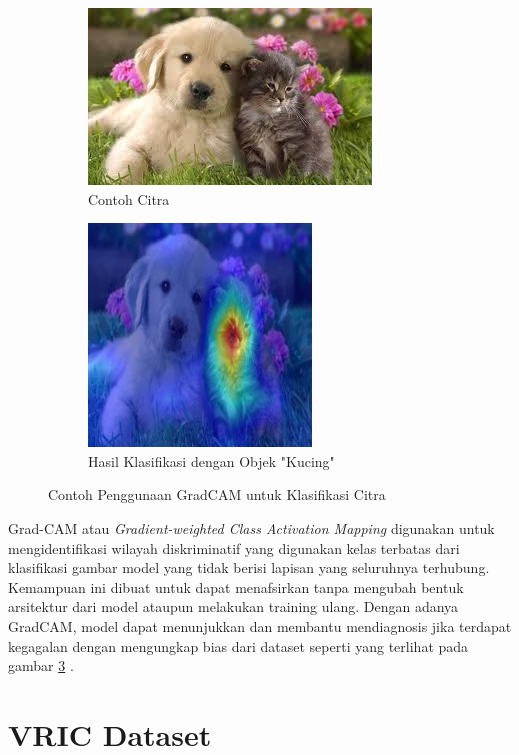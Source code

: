 \begin{figure}[h!]
  \centering
  \begin{subfigure}{.5\textwidth}
    \centering
    \includegraphics[width=.6\linewidth]{gambar/dog_cat.jpg}
    \caption{Contoh Citra}
    \label{fig:contohcitraGradCAM}
  \end{subfigure}%
  \begin{subfigure}{.5\textwidth}
    \centering
    \includegraphics[width=.4\linewidth]{gambar/swinT_cat_gradcam_cam.jpg}
    \caption{Hasil Klasifikasi dengan Objek "Kucing"}
    \label{hasilklasifikasiobjekGradCAM}
  \end{subfigure}
  \caption{Contoh Penggunaan GradCAM untuk Klasifikasi Citra}
  \label{fig:contohpenggunaangradcamuntukklasifikasicitra}
\end{figure}

Grad-CAM atau \emph{Gradient-weighted Class Activation Mapping} digunakan untuk mengidentifikasi wilayah diskriminatif yang digunakan kelas terbatas dari klasifikasi gambar model 
yang tidak berisi lapisan yang seluruhnya terhubung. Kemampuan ini dibuat untuk dapat menafsirkan tanpa mengubah bentuk arsitektur dari model ataupun melakukan training ulang. 
Dengan adanya GradCAM, model dapat menunjukkan dan membantu mendiagnosis jika terdapat kegagalan dengan mengungkap bias dari dataset seperti yang terlihat pada gambar 
\ref{fig:contohpenggunaangradcamuntukklasifikasicitra} \parencite{Selvaraju2019}.

\section{VRIC Dataset}
\label{sec:vricdataset}

